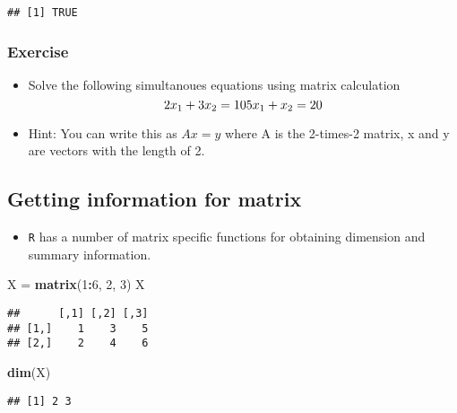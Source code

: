 \documentclass[]{book}
\newenvironment{Shaded}{\begin{snugshade}}{\end{snugshade}}
\newcommand{\DecValTok}[1]{\textcolor[rgb]{0.00,0.00,0.81}{#1}}
\newcommand{\KeywordTok}[1]{\textcolor[rgb]{0.13,0.29,0.53}{\textbf{#1}}}
\newcommand{\NormalTok}[1]{#1}
\newcommand{\OperatorTok}[1]{\textcolor[rgb]{0.81,0.36,0.00}{\textbf{#1}}}
\newcommand{\StringTok}[1]{\textcolor[rgb]{0.31,0.60,0.02}{#1}}
\providecommand{\tightlist}{%
  \setlength{\itemsep}{0pt}\setlength{\parskip}{0pt}}
\begin{document}
\begin{verbatim}
## [1] TRUE
\end{verbatim}

\hypertarget{exercise}{%
\subsubsection{Exercise}\label{exercise}}

\begin{itemize}
\tightlist
\item
  Solve the following simultanoues equations using matrix calculation
  \[
  2x_1+3x_2   =10 \\
  5x_1+x_2    =20
  \]
\item
  Hint: You can write this as \(Ax=y\) where A is the 2-times-2 matrix, x and y are vectors with the length of 2.
\end{itemize}

\hypertarget{getting-information-for-matrix}{%
\subsection{Getting information for matrix}\label{getting-information-for-matrix}}

\begin{itemize}
\tightlist
\item
  \texttt{R} has a number of matrix specific functions for obtaining dimension and summary information.
\end{itemize}

\begin{Shaded}
\begin{Highlighting}[]
\NormalTok{X =}\StringTok{ }\KeywordTok{matrix}\NormalTok{(}\DecValTok{1}\OperatorTok{:}\DecValTok{6}\NormalTok{, }\DecValTok{2}\NormalTok{, }\DecValTok{3}\NormalTok{)}
\NormalTok{X}
\end{Highlighting}
\end{Shaded}

\begin{verbatim}
##      [,1] [,2] [,3]
## [1,]    1    3    5
## [2,]    2    4    6
\end{verbatim}

\begin{Shaded}
\begin{Highlighting}[]
\KeywordTok{dim}\NormalTok{(X)}
\end{Highlighting}
\end{Shaded}

\begin{verbatim}
## [1] 2 3
\end{verbatim}
\end{document}

